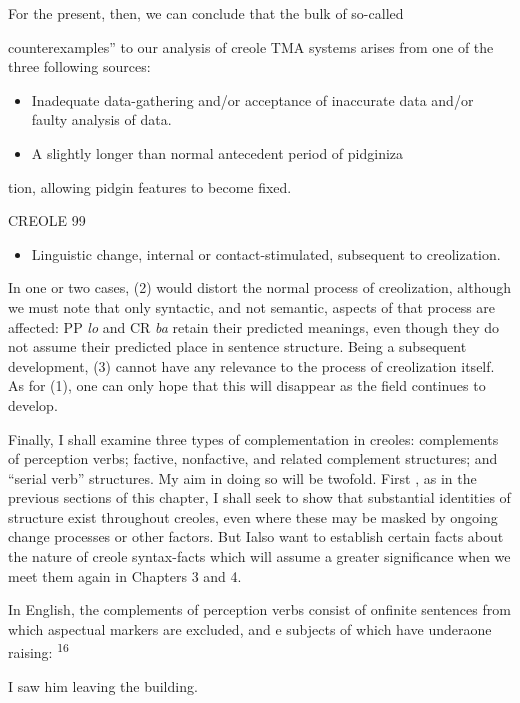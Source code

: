 For the present, then, we can conclude that the bulk of so-called

{\textquotedbl}counterexamples'' to our analysis of creole TMA systems arises from one of the three following sources:

\begin{itemize}
\item Inadequate data-gathering and/or acceptance of inaccurate data and/or faulty analysis of data.
\item A slightly longer than normal antecedent period of pidginiza
\end{itemize}

tion, allowing pidgin features to become fixed.

CREOLE 99

\begin{itemize}
\item Linguistic change, internal or contact-stimulated, subsequent to creolization.
\end{itemize}

In one or two cases, (2) would distort the normal process of creoliza\-tion, although we must note that only syntactic, and not semantic, aspects of that process are affected: PP \textit{lo} and CR \textit{ba} retain their predicted meanings, even though they do not assume their predicted place in sentence structure. Being a subsequent development, (3) cannot have any relevance to the process of creolization itself. As for (1), one can only hope that this will disappear as the field continues to develop.

Finally, I shall examine three types of complementation in creoles: complements of perception verbs; factive, nonfactive, and related complement structures; and ``serial verb'' structures. My aim in doing so will be twofold. First , as in the previous sections of this chapter, I shall seek to show that substantial identities of structure exist throughout creoles, even where these may be masked by ongoing change processes or other factors. But Ialso want to establish certain facts about the nature of creole syntax-facts which will assume a greater significance when we meet them again in Chapters 3 and 4.

In English, the complements of perception verbs consist of onfinite sentences from which aspectual markers are excluded, and e subjects of which have underaone raising: \textsuperscript{1}\textsuperscript{6}

\ea\label{ex:125}
 I saw him leaving the building.
\glt
\z

